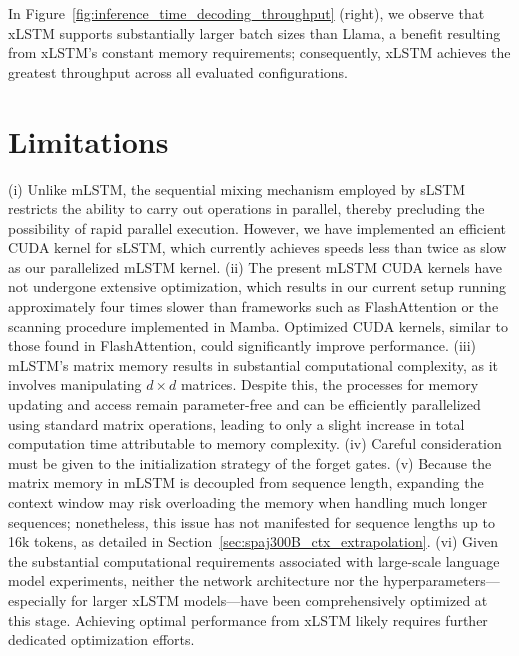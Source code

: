 In Figure~\ref{fig:inference_time_decoding_throughput} (right), we observe that xLSTM supports substantially larger batch sizes than Llama, a benefit resulting from xLSTM’s constant memory requirements; consequently, xLSTM achieves the greatest throughput across all evaluated configurations.

\section{Limitations}

(i) Unlike mLSTM, the sequential mixing mechanism employed by sLSTM restricts the ability to carry out operations in parallel, thereby precluding the possibility of rapid parallel execution. However, we have implemented an efficient CUDA kernel for sLSTM, which currently achieves speeds less than twice as slow as our parallelized mLSTM kernel. (ii) The present mLSTM CUDA kernels have not undergone extensive optimization, which results in our current setup running approximately four times slower than frameworks such as FlashAttention or the scanning procedure implemented in Mamba. Optimized CUDA kernels, similar to those found in FlashAttention, could significantly improve performance. (iii) mLSTM's matrix memory results in substantial computational complexity, as it involves manipulating $d \times d$ matrices. Despite this, the processes for memory updating and access remain parameter-free and can be efficiently parallelized using standard matrix operations, leading to only a slight increase in total computation time attributable to memory complexity. (iv) Careful consideration must be given to the initialization strategy of the forget gates. (v) Because the matrix memory in mLSTM is decoupled from sequence length, expanding the context window may risk overloading the memory when handling much longer sequences; nonetheless, this issue has not manifested for sequence lengths up to 16k tokens, as detailed in Section~\ref{sec:spaj300B_ctx_extrapolation}. (vi) Given the substantial computational requirements associated with large-scale language model experiments, neither the network architecture nor the hyperparameters—especially for larger xLSTM models—have been comprehensively optimized at this stage. Achieving optimal performance from xLSTM likely requires further dedicated optimization efforts.

